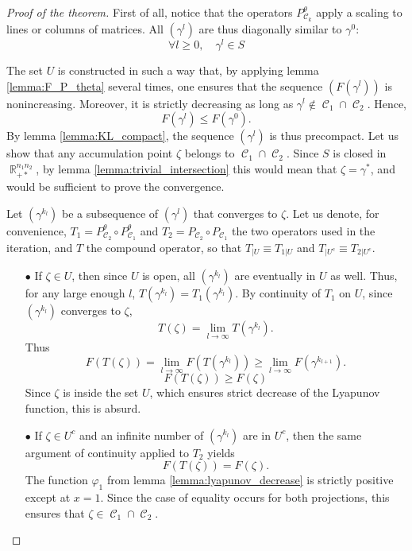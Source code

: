 \documentclass{article} %
\DeclareMathOperator{\IR}{\mathbb{R}}
\DeclareMathOperator{\Ccal}{\mathcal{C}}
\theoremstyle{plain}
\theoremstyle{definition}
\theoremstyle{remark}
\begin{document}
\begin{proof}[Proof of the theorem]
	First of all, notice that the operators $P_{\Ccal_k}^\theta$ apply a scaling to lines or columns of matrices. All $(\gamma^l)$ are thus diagonally similar to $\gamma^0$:
	\[
	\forall l\ge0,\quad \gamma^l \in S
	\]
	
	The set $U$ is constructed in such a way that, by applying lemma \ref{lemma:F_P_theta} several times, one ensures that the sequence $(F(\gamma^l))$ is nonincreasing. Moreover, it is strictly decreasing as long as $\gamma^l \not \in \Ccal_1 \cap \Ccal_2$.
	Hence, 
	\[
	F(\gamma^l) \le F(\gamma^0).
	\]
	By lemma \ref{lemma:KL_compact}, the sequence $(\gamma^l)$ is thus precompact. Let us show that any accumulation point $\zeta$ belongs to $\Ccal_1 \cap \Ccal_2$. Since $S$ is closed in $\IR_{+*}^{n_1 n_2}$, by lemma \ref{lemma:trivial_intersection} this would mean that $\zeta = \gamma^*$, and would be sufficient to prove the convergence.
	
	Let $(\gamma^{k_l})$ be a subsequence of $(\gamma^l)$ that converges to $\zeta$.
	Let us denote, for convenience, $T_1 = P_{\Ccal_2}^\theta \circ P_{\Ccal_1}^\theta$ and $T_2 = P_{\Ccal_2} \circ P_{\Ccal_1}$ the two operators used in the iteration, and $T$ the compound operator, so that $T_{|U} \equiv T_{1|U}$ and $T_{|U^c} \equiv T_{2|U^c}$.
	\begin{enumerate}[align=right,labelsep=10pt,leftmargin=0.5cm]
		\item[$\bullet$] If $\zeta \in U$, then since $U$ is open, all $(\gamma^{k_l})$ are eventually in $U$ as well.
		Thus, for any large enough $l$, $ T(\gamma^{k_l}) = T_1(\gamma^{k_l}) $. By continuity of $T_1$ on $U$, since $(\gamma^{k_l})$ converges to $\zeta$, 
		\[T(\zeta) = \lim_{l\rightarrow \infty} T(\gamma^{k_l}).\] Thus
		 \[F(T(\zeta)) = \lim_{l \rightarrow \infty} F(T(\gamma^{k_l})) \ge \lim_{l\rightarrow \infty} F(\gamma^{k_{l+1}}) .\]
		 \[
		 F(T(\zeta)) \ge F(\zeta)
		 \] Since $\zeta$ is inside the set $U$, which ensures strict decrease of the Lyapunov function, this is absurd.
		\item[$\bullet$] If $\zeta \in U^c$ and an infinite number of $(\gamma^{k_l})$ are in $U^c$, then the same argument of continuity applied to $T_2$ yields
		 \[
		 F(T(\zeta)) = F(\zeta).
		 \]
		 The function $\varphi_1$ from lemma \ref{lemma:lyapunov_decrease} is strictly positive except at $x=1$. Since the case of equality occurs for both projections, this ensures that $\zeta \in \Ccal_1 \cap \Ccal_2$.
		 

\end{enumerate}
\end{proof}
\end{document}
